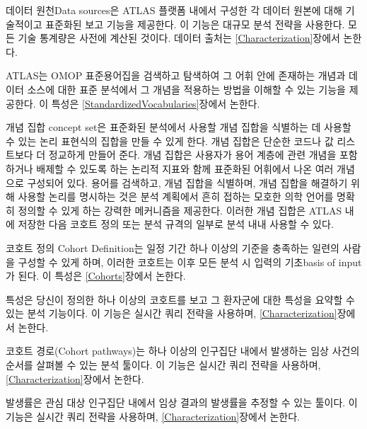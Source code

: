 \documentclass[10.5pt]{book}
\providecommand{\tightlist}{%
  \setlength{\itemsep}{0pt}\setlength{\parskip}{0pt}}
\theoremstyle{definition}
\theoremstyle{definition}
\theoremstyle{definition}
\theoremstyle{remark}
\begin{document}
\begin{description}
\tightlist
\item[Data Sources \index{ATLAS!Data Sources}
\index{Achilles|see {ATLAS!data sources}}]
데이터 원천Data sources은 ATLAS 플랫폼 내에서 구성한 각 데이터 원본에
대해 기술적이고 표준화된 보고 기능을 제공한다. 이 기능은 대규모 분석
전략을 사용한다. 모든 기술 통계량은 사전에 계산된 것이다. 데이터 출처는
\ref{Characterization}장에서 논한다.
\item[Vocabulary Search \index{ATLAS!vocabulary search}]
ATLAS는 OMOP 표준용어집을 검색하고 탐색하여 그 어휘 안에 존재하는 개념과
데이터 소스에 대한 표준 분석에서 그 개념을 적용하는 방법을 이해할 수
있는 기능을 제공한다. 이 특성은 \ref{StandardizedVocabularies}장에서
논한다.
\item[Concept Sets \index{ATLAS!concept sets}]
개념 집합 concept set은 표준화된 분석에서 사용할 개념 집합을 식별하는 데
사용할 수 있는 논리 표현식의 집합을 만들 수 있게 한다. 개념 집합은
단순한 코드나 값 리스트보다 더 정교하게 만들어 준다. 개념 집합은
사용자가 용어 계층에 관련 개념을 포함하거나 배제할 수 있도록 하는 논리적
지표와 함께 표준화된 어휘에서 나온 여러 개념으로 구성되어 있다. 용어를
검색하고, 개념 집합을 식별하며, 개념 집합을 해결하기 위해 사용할 논리를
명시하는 것은 분석 계획에서 흔히 접하는 모호한 의학 언어를 명확히 정의할
수 있게 하는 강력한 메커니즘을 제공한다. 이러한 개념 집합은 ATLAS 내에
저장한 다음 코호트 정의 또는 분석 규격의 일부로 분석 내내 사용할 수
있다.
\item[Cohort Definitions \index{ATLAS!cohort definitions}]
코호트 정의 Cohort Definition는 일정 기간 하나 이상의 기준을 충족하는
일련의 사람을 구성할 수 있게 하며, 이러한 코호트는 이후 모든 분석 시
입력의 기초basis of input가 된다. 이 특성은 \ref{Cohorts}장에서 논한다.
\item[Characterizations \index{ATLAS!cohort characterization}]
특성은 당신이 정의한 하나 이상의 코호트를 보고 그 환자군에 대한 특성을
요약할 수 있는 분석 기능이다. 이 기능은 실시간 쿼리 전략을 사용하며,
\ref{Characterization}장에서 논한다.
\item[Cohort Pathways \index{ATLAS!cohort pathways}]
코호트 경로(Cohort pathways)는 하나 이상의 인구집단 내에서 발생하는 임상
사건의 순서를 살펴볼 수 있는 분석 툴이다. 이 기능은 실시간 쿼리 전략을
사용하며, \ref{Characterization}장에서 논한다.
\item[Incidence Rates \index{ATLAS!incidence rates}]
발생률은 관심 대상 인구집단 내에서 임상 결과의 발생률을 추정할 수 있는
툴이다. 이 기능은 실시간 쿼리 전략을 사용하며,
\ref{Characterization}장에서 논한다.

\end{description}
\end{document}
